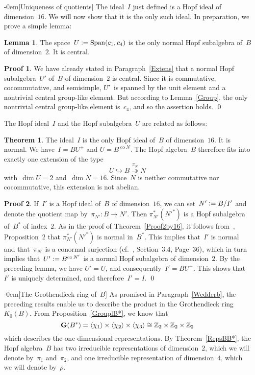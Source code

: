 \documentclass{article}
\makeatletter
\renewcommand{\subsection}{\@startsection{subsection}{2}{0em}%
{\baselineskip}{-0em}{\bfseries\normalsize}}
\numberwithin{equation}{section}
\theoremstyle{definition}
\newtheorem*{lem}{Lemma}
\newtheorem*{pf}{Proof}
\newtheorem*{thm}{Theorem}
\theoremstyle{break}
\newcommand{\dm}{\operatorname{dim}}
\newcommand{\Span}{\operatorname{Span}}
\newcommand{\co}{\scriptstyle \operatorname{co}}
\newcommand{\deq}{\vcentcolon =}
\newcommand{\1}{{(1)}}
\newcommand{\2}{{(2)}}
\newcommand{\3}{{(3)}}
\newcommand{\Z}{{\mathbb Z}}
\makeatother
\begin{document}
\subsection[Uniqueness of quotients]{} \label{16by2}
The ideal~$I$ just defined is a Hopf ideal of dimension~$16$. We will now show that it is the only such ideal. In preparation, we prove a simple lemma:
\begin{lem}
The space~$U \deq \Span(c_1, c_4)$ is the only normal Hopf subalgebra of~$B$ of dimension~$2$. It is central.
\end{lem}
\begin{pf}
We have already stated in Paragraph~\ref{Extens} that a normal Hopf subalgebra~$U'$ of~$B$ of dimension~$2$ is central. Since it is commutative, cocommutative, and semisimple, $U'$~is spanned by the unit element and a nontrivial central group-like element. But according to Lemma~\ref{Group}, the only nontrivial central group-like element is~$c_4$, and so the assertion holds.
\qed
\end{pf}

The Hopf ideal~$I$ and the Hopf subalgebra~$U$ are related as follows:
\begin{thm}
The ideal~$I$ is the only Hopf ideal of~$B$ of dimension~$16$. It is normal. We have~$I = BU^+$ and $U = B^{\co N}$. The Hopf algebra~$B$ therefore fits into exactly one extension of the type
\[U \hookrightarrow B \overset{\pi_N}{\twoheadrightarrow} N\]
with~$\dm U = 2$ and~$\dm N = 16$. Since~$N$ is neither commutative nor cocommutative, this extension is not abelian.
\end{thm}
\begin{pf}
If~$I'$ is a Hopf ideal of~$B$ of dimension~$16$, we can set~$N' \deq B/I'$ and denote the quotient map by~$\pi_{N'} \colon B \to N'$. Then $\pi_{N'}^*(N'^*)$ is a Hopf subalgebra of~$B^*$ of index~$2$. As in the proof of Theorem~\ref{Proof2by16}, it follows from~\cite{KoMa}, Proposition~2 that $\pi_{N'}^*(N'^*)$ is normal in~$B^*$. This implies that~$I'$ is normal and that~$\pi_{N'}$ is a conormal surjection (cf.~\cite{M}, Section~3.4, Page~36), which in turn implies that~$U' \deq B^{\co N'}$ is a normal Hopf subalgebra of dimension~$2$. By the preceding lemma, we have $U'=U$, and consequently~$I'=BU^+$. This shows that~$I'$ is uniquely determined, and therefore~$I'=I$.
\qed
\end{pf}


\subsection[The Grothendieck ring of~$B$]{} \label{GrothB}
As promised in Paragraph~\ref{Wedderb}, the preceding results enable us to describe the product in the Grothendieck ring~$K_{0}(B)$. From Proposition~\ref{GrouplB*}, we know that
\[{\bf G}(B^*) = \left\langle \chi_1 \right\rangle \times \left\langle \chi_2 \right\rangle \times \left\langle \chi_3 \right\rangle \cong \Z_2 \times \Z_2 \times \Z_2\]
which describes the one-dimensional representations. By Theorem~\ref{RepsBB*}, the Hopf algebra~$B$ has two irreducible representations of dimension~$2$, which we will denote by~$\pi_{1}$ and~$\pi_{2}$, and one irreducible representation of dimension~$4$, which we will denote by~$\rho$.
\end{document}
